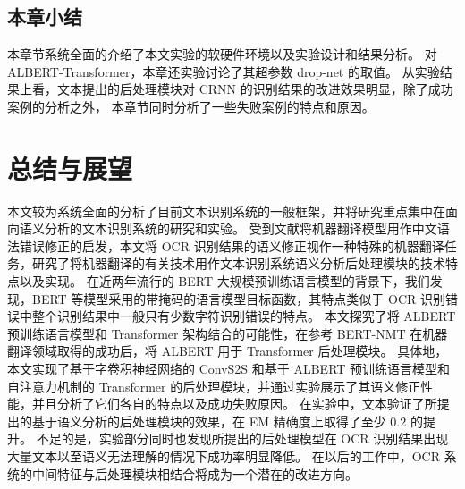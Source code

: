 \section{本章小结}
\label{exp_conclusion}

本章节系统全面的介绍了本文实验的软硬件环境以及实验设计和结果分析。
对 ALBERT-Transformer，本章还实验讨论了其超参数 drop-net 的取值。
从实验结果上看，文本提出的后处理模块对 CRNN 的识别结果的改进效果明显，除了成功案例的分析之外，
本章节同时分析了一些失败案例的特点和原因。

\chapter{总结与展望}
\label{chap:conclusions}  
本文较为系统全面的分析了目前文本识别系统的一般框架，并将研究重点集中在面向语义分析的文本识别系统的研究和实验。
受到文献\cite{NLPCC}将机器翻译模型用作中文语法错误修正的启发，本文将 OCR 识别结果的语义修正视作一种特殊的机器翻译任务，研究了将机器翻译的有关技术用作文本识别系统语义分析后处理模块的技术特点以及实现。
在近两年流行的 BERT\cite{bert} 大规模预训练语言模型的背景下，我们发现，BERT 等模型采用的带掩码的语言模型目标函数，其特点类似于 OCR 识别错误中整个识别结果中一般只有少数字符识别错误的特点。
本文探究了将 ALBERT\cite{albert} 预训练语言模型和 Transformer 架构结合的可能性，在参考 BERT-NMT\cite{bert_nmt} 在机器翻译领域取得的成功后，将 ALBERT 用于 Transformer 后处理模块。
具体地，本文实现了基于字卷积神经网络的 ConvS2S 和基于 ALBERT 预训练语言模型和自注意力机制的 Transformer 的后处理模块，并通过实验展示了其语义修正性能，并且分析了它们各自的特点以及成功失败原因。
在实验中，文本验证了所提出的基于语义分析的后处理模块的效果，在 EM 精确度上取得了至少 $0.2$ 的提升。
不足的是，实验部分同时也发现所提出的后处理模型在 OCR 识别结果出现大量文本以至语义无法理解的情况下成功率明显降低。
在以后的工作中，OCR 系统的中间特征与后处理模块相结合将成为一个潜在的改进方向。

